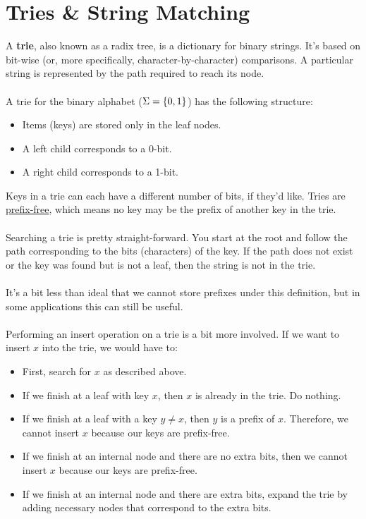 \documentclass[]{article}
\theoremstyle{definition}
\DeclarePairedDelimiter{\set}{\lbrace}{\rbrace}
\newcommand{\lecture}[1]{\marginpar{{\footnotesize $\leftarrow$ \underline{#1}}}}
\begin{document}
	\section{Tries \& String Matching} \lecture{March 19, 2013} %
		A \textbf{trie}, also known as a radix tree, is a dictionary for binary strings. It's based on bit-wise (or, more specifically, character-by-character) comparisons. A particular string is represented by the path required to reach its node.
		\\ \\
		A trie for the binary alphabet ($\Sigma = \set{0, 1}$) has the following structure:
		\begin{itemize}
			\item Items (keys) are stored only in the leaf nodes.
			\item A left child corresponds to a 0-bit.
			\item A right child corresponds to a 1-bit.
		\end{itemize}

		Keys in a trie can each have a different number of bits, if they'd like. Tries are \underline{prefix-free}, which means no key may be the prefix of another key in the trie.
		\\ \\
		Searching a trie is pretty straight-forward. You start at the root and follow the path corresponding to the bits (characters) of the key. If the path does not exist or the key was found but is not a leaf, then the string is not in the trie.
		\\ \\
		It's a bit less than ideal that we cannot store prefixes under this definition, but in some applications this can still be useful.
		\\ \\
		Performing an insert operation on a trie is a bit more involved. If we want to insert $x$ into the trie, we would have to:
		\begin{itemize}
			\item First, search for $x$ as described above.
			\item If we finish at a leaf with key $x$, then $x$ is already in the trie. Do nothing.
			\item If we finish at a leaf with a key $y \ne x$, then $y$ is a prefix of $x$. Therefore, we cannot insert $x$ because our keys are prefix-free.
			\item If we finish at an internal node and there are no extra bits, then we cannot insert $x$ because our keys are prefix-free.
			\item If we finish at an internal node and there are extra bits, expand the trie by adding necessary nodes that correspond to the extra bits.
		\end{itemize}
\end{document}

